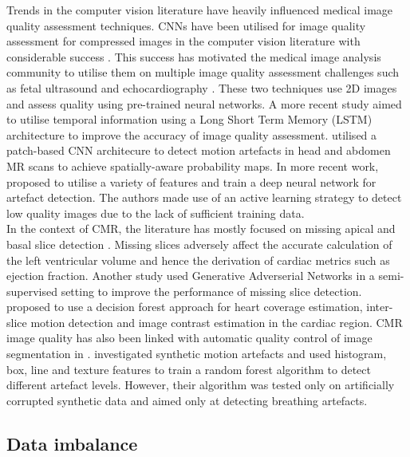 \documentclass[preprint,12pt,authoryear]{elsarticle}
\begin{document}
Trends in the computer vision literature have heavily influenced medical image quality assessment techniques.
CNNs have been utilised for image quality assessment for compressed images in the computer vision literature with considerable success \citep{Kang2014}. This success has motivated the medical image analysis community to utilise them on multiple image quality assessment challenges such as fetal ultrasound \citep{Wu2017} and echocardiography \citep{Abdi2017}. These two techniques use 2D images and assess quality using pre-trained neural networks. A more recent study \citep{Abdi2017a} aimed to utilise temporal information using a Long Short Term Memory (LSTM) architecture to improve the accuracy of image quality assessment. \cite{Kuestner2018a} utilised a patch-based CNN architecure to detect motion artefacts in head and abdomen MR scans to achieve spatially-aware probability maps. In more recent work, \cite{Kuestner2018} proposed to utilise a variety of features and train a deep neural network for artefact detection. The authors made use of an active learning strategy to detect low quality images due to the lack of sufficient training data.\\


 In the context of CMR, the literature has mostly focused on  missing apical and basal slice detection \citep{Zhang2016}. Missing slices adversely affect the accurate calculation of the left ventricular volume and hence the derivation of cardiac metrics such as ejection fraction. Another study \citep{Zhang2017} used Generative Adverserial Networks in a semi-supervised setting to improve the performance of missing slice detection. 
 \cite{Tarroni2018} proposed to use a decision forest approach for heart coverage estimation, inter-slice motion detection and image contrast estimation in the cardiac region.  
 CMR image quality has also been linked with automatic quality control of image segmentation in \cite{Robinson2017}.
 \cite{Lorch2017} investigated synthetic motion artefacts and used histogram, box, line and texture features to train a random forest algorithm to detect different artefact levels. However, their algorithm was tested only on artificially corrupted synthetic data and aimed only at detecting breathing artefacts.
 
 
\subsection{Data imbalance}
\label{sec:dataimbalance}
\end{document}
